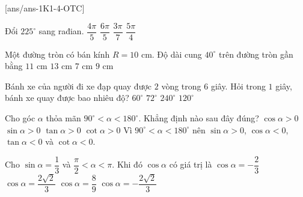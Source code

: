 
[ans/ans-1K1-4-OTC]
\begin{ex}%
	Đổi $225^\circ$ sang rađian.
	\choice
	{$\dfrac{4\pi}{5}$}
	{$\dfrac{6\pi}{5}$}
	{$\dfrac{3\pi}{7}$}
	{\True $\dfrac{5\pi}{4}$}
\end{ex}
\begin{ex}%
	Một đường tròn có bán kính $R=10$ cm. Độ dài cung $40^\circ$ trên đường tròn gần bằng
	\choice
	{$11$ cm}
	{$13$ cm}
	{\True $7$ cm}
	{$9$ cm}
\end{ex}
\begin{ex}%
	Bánh xe của người đi xe đạp quay được $2$ vòng trong $6$ giây. Hỏi trong $1$ giây, bánh xe quay được bao nhiêu độ?
	\choice
	{$60^\circ$}
	{$72^\circ$}
	{$240^\circ$}
	{\True $120^\circ$}
\end{ex}
\begin{ex}%
	Cho góc $\alpha$ thỏa mãn $90^\circ <\alpha <180^\circ$. Khẳng định nào sau đây đúng?
	\choice
	{$\cos\alpha>0$}
	{\True $\sin\alpha>0$}
	{$\tan\alpha>0$}
	{$\cot\alpha>0$}
	\loigiai
	{Vì $90^\circ <\alpha <180^\circ$ nên $\sin\alpha>0$, $\cos\alpha<0$, $\tan\alpha<0$ và $\cot\alpha<0$.}
\end{ex}
\begin{ex}%
	Cho $\sin \alpha =\dfrac{1}{3}$ và $\dfrac{\pi}{2}<\alpha<\pi$. Khi đó $\cos \alpha$ có giá trị là
	\choice
	{$\cos \alpha =-\dfrac{2}{3}$}
	{$\cos \alpha =\dfrac{2\sqrt{2}}{3}$}
	{$\cos \alpha =\dfrac{8}{9}$}
	{\True $\cos \alpha =-\dfrac{2\sqrt{2}}{3}$}
\end{ex}
